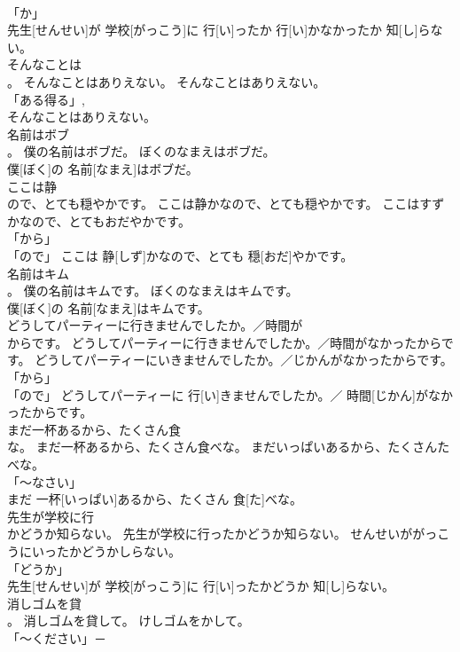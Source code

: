 \documentclass[8pt]{extreport}
\begin{document}
\begin{CJK}{UTF8}{min}
\\	「か」 
\\	先生[せんせい]が 学校[がっこう]に 行[い]ったか 行[い]かなかったか 知[し]らない。		
\\	そんなことは
\\	。	そんなことはありえない。	そんなことはありえない。	
\\	「ある得る」, 
\\	そんなことはありえない。		
\\	名前はボブ
\\	。	僕の名前はボブだ。	ぼくのなまえはボブだ。	
\\	僕[ぼく]の 名前[なまえ]はボブだ。		
\\	ここは静
\\	ので、とても穏やかです。	ここは静かなので、とても穏やかです。	ここはすずかなので、とてもおだやかです。	
\\	「から」 
\\	「ので」	ここは 静[しず]かなので、とても 穏[おだ]やかです。		
\\	名前はキム
\\	。	僕の名前はキムです。	ぼくのなまえはキムです。	
\\	僕[ぼく]の 名前[なまえ]はキムです。		
\\	どうしてパーティーに行きませんでしたか。／時間が
\\	からです。	どうしてパーティーに行きませんでしたか。／時間がなかったからです。	どうしてパーティーにいきませんでしたか。／じかんがなかったからです。	
\\	「から」 
\\	「ので」	どうしてパーティーに 行[い]きませんでしたか。／ 時間[じかん]がなかったからです。		
\\	まだ一杯あるから、たくさん食
\\	な。	まだ一杯あるから、たくさん食べな。	まだいっぱいあるから、たくさんたべな。	
\\	「～なさい」 
\\	まだ 一杯[いっぱい]あるから、たくさん 食[た]べな。		
\\	先生が学校に行
\\	かどうか知らない。	先生が学校に行ったかどうか知らない。	せんせいががっこうにいったかどうかしらない。	
\\	「どうか」 
\\	先生[せんせい]が 学校[がっこう]に 行[い]ったかどうか 知[し]らない。		
\\	消しゴムを貸
\\	。	消しゴムを貸して。	けしゴムをかして。	
\\	「～ください」－ 

\end{CJK}
\end{document}
